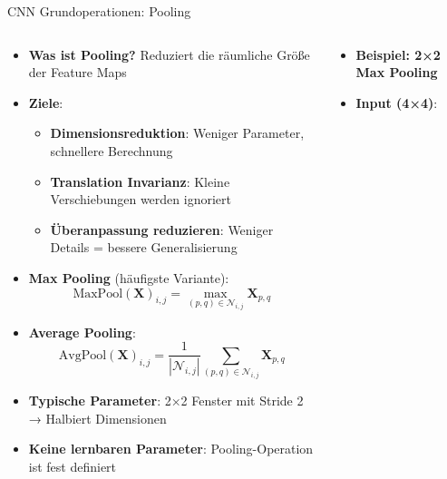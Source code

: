 \documentclass[aspectratio=1610, xcolor=dvipsnames, 9pt]{beamer}
\begin{document}
      \begin{frame}{CNN Grundoperationen: Pooling}
        \begin{columns}
          \begin{column}{0.65\textwidth}
            \begin{itemize}
              \item \textbf{Was ist Pooling?} Reduziert die räumliche Größe der Feature Maps
              \item \textbf{Ziele}:
              \begin{itemize}
                \item \textbf{Dimensionsreduktion}: Weniger Parameter, schnellere Berechnung
                \item \textbf{Translation Invarianz}: Kleine Verschiebungen werden ignoriert
                \item \textbf{Überanpassung reduzieren}: Weniger Details = bessere Generalisierung
              \end{itemize}
              \item \textbf{Max Pooling} (häufigste Variante):
              \begin{equation}
                \text{MaxPool}(\mathbf{X})_{i,j} = \max_{(p,q) \in \mathcal{N}_{i,j}} \mathbf{X}_{p,q}
              \end{equation}
              \item \textbf{Average Pooling}:
              \begin{equation}
                \text{AvgPool}(\mathbf{X})_{i,j} = \frac{1}{|\mathcal{N}_{i,j}|} \sum_{(p,q) \in \mathcal{N}_{i,j}} \mathbf{X}_{p,q}
              \end{equation}
              \item \textbf{Typische Parameter}: 2×2 Fenster mit Stride 2 → Halbiert Dimensionen
              \item \textbf{Keine lernbaren Parameter}: Pooling-Operation ist fest definiert
            \end{itemize}
          \end{column}
          \begin{column}{0.35\textwidth}
            \begin{itemize}
              \item \textbf{Beispiel: 2×2 Max Pooling}
              \vspace{0.5cm}
              \item \textbf{Input (4×4)}:
              \begin{equation*}

\end{equation*}
\end{itemize}
\end{column}
\end{columns}
\end{frame}
\end{document}
